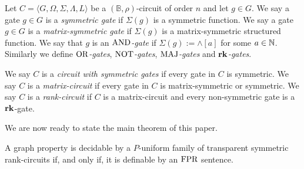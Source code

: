\documentclass[../paper.tex]{subfiles}
\begin{document}

Let $C = \langle G, \Omega, \Sigma, \Lambda, L \rangle$ be a $(\mathbb{B},
\rho)$-circuit of order $n$ and let $g \in G$. We say a gate $g \in G$ is a
\emph{symmetric gate} if $\Sigma(g)$ is a symmetric function. We say a gate $g
\in G$ is a \emph{matrix-symmetric gate} if $\Sigma(g)$ is a matrix-symmetric
structured function. We say that $g$ is an \emph{$\text{\upshape AND}$-gate} if $\Sigma(g) :=
\land [a]$ for some $a \in \mathbb{N}$. Similarly we define \emph{$\text{\upshape OR}$-gates},
\emph{$\text{\upshape NOT}$-gates}, \emph{$\text{\upshape MAJ}$-gates} and \emph{$\text{\textbf{rk}}$-gates}.

We say $C$ is a \emph{circuit with symmetric gates} if every gate in $C$ is
symmetric. We say $C$ is a \emph{matrix-circuit} if every gate in $C$ is
matrix-symmetric or symmetric. We say $C$ is a \emph{rank-circuit} if $C$ is a
matrix-circuit and every non-symmetric gate is a $\text{\textbf{rk}}$-gate.




We are now ready to state the main theorem of this paper.

\begin{thm}
  A graph property is decidable by a $P$-uniform family of transparent symmetric
  rank-circuits if, and only if, it is definable by an $\text{\upshape FPR}$ sentence.
\end{thm}
\end{document}
